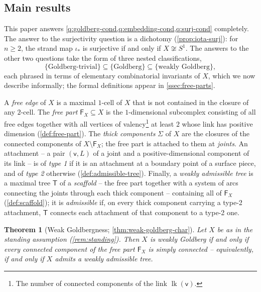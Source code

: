\documentclass[reqno]{amsart}
\newtheorem{theorem}{Theorem}[section]
\theoremstyle{definition}
\newcommand\sfT{\mathsf{T}}
\newcommand\sfv{\mathsf{v}}
\DeclareMathOperator{\lk}{lk}
\numberwithin{equation}{section}
\begin{document}
\subsection{Main results}
\label{ssec:main-results}

This paper answers
\cref{q:goldberg-cond,q:embedding-cond,q:surj-cond} completely.
The answer to the surjectivity question is a dichotomy
(\cref{prop:iota-surj}): for \(n\geq2\), the strand map
\(\iota_\ast\) is surjective if and only if
\(X\not\cong S^1\). The answers to the other two questions take
the form of three nested classifications,
\[
\{\text{Goldberg-trivial}\}\subseteq\{\text{Goldberg}\}
\subseteq\{\text{weakly Goldberg}\},
\]
each phrased in terms of elementary combinatorial invariants of
\(X\), which we now describe informally; the formal definitions
appear in \cref{ssec:free-parts}.

A \emph{free edge} of \(X\) is a maximal \(1\)-cell of \(X\)
that is not contained in the closure of any \(2\)-cell. The
\emph{free part} \(\mathsf{F}_X\subseteq X\) is the
\(1\)-dimensional subcomplex consisting of all free edges
together with all vertices of valency\footnote{The number of
connected components of the link \(\lk(\sfv)\).} at least \(2\)
whose link has positive dimension
(\cref{def:free-part}). The \emph{thick components}
\(\Sigma\) of \(X\) are the closures of the connected components
of \(X\setminus\mathsf{F}_X\); the free part is attached to them
at \emph{joints}. An attachment -- a pair \((\sfv,L)\) of a joint
and a positive-dimensional component of its link -- is of
\emph{type 1} if it is an attachment at a boundary point of a
surface piece, and of \emph{type 2} otherwise
(\cref{def:admissible-tree}). Finally, a
\emph{weakly admissible tree} is a maximal tree \(\sfT\) of a \emph{scaffold} -- the free part together with a system of arcs
connecting the joints through each thick component -- containing
all of \(\mathsf{F}_X\) (\cref{def:scaffold}); it is
\emph{admissible} if, on every thick component carrying
a type-2 attachment, \(\sfT\) connects each attachment of that
component to a type-2 one.

\begin{theorem}[Weak Goldbergness;
\cref{thm:weak-goldberg-char}]\label{thm:main-intro}
Let \(X\) be as in the standing assumption
(\cref{rem:standing}). Then \(X\) is weakly Goldberg if
and only if every connected component of the free part
\(\mathsf{F}_X\) is simply connected -- equivalently, if and
only if \(X\) admits a weakly admissible tree.
\end{theorem}
\end{document}
